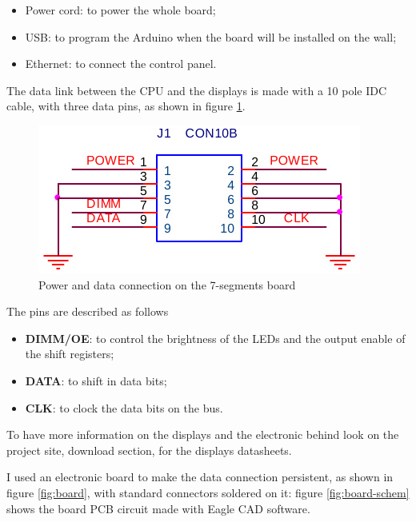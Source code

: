 \documentclass[11pt,english]{article}
\begin{document}
\begin{itemize}
 \item Power cord: to power the whole board;
 \item USB: to program the Arduino when the board will be installed on the wall;
 \item Ethernet: to connect the control panel.
\end{itemize}

The data link between the CPU and the displays is made with a 10 pole IDC cable, with three data pins, 
as shown in figure \ref{fig:j1}. 

%
\begin{figure}[htb]
\centering\includegraphics[scale=0.45]{img/J1-con}

\caption{Power and data connection on the 7-segments board \label{fig:j1}}

\end{figure}

The pins are described as follows
\begin{itemize}
 \item \textbf{DIMM/OE}: to control the brightness of the LEDs and the output enable of the shift registers;
 \item \textbf{DATA}: to shift in data bits;
 \item \textbf{CLK}: to clock the data bits on the bus.
\end{itemize}

To have more information on the displays and the electronic behind look on the project site, download 
section, for the displays datasheets.

I used an electronic board to make the data connection persistent, as shown in figure \ref{fig:board}, 
with standard connectors soldered on it: figure \ref{fig:board-schem} shows the board PCB circuit made with 
Eagle CAD software.
\end{document}
